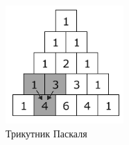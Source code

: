 \begin{frame}
\begin{figure}
\begin{center}
 \includegraphics[width=0.4\textwidth]{pictures/pascal.png}
\caption{Трикутник Паскаля}
\label{pascal} 
\end{center}
\end{figure}
\end{frame}
